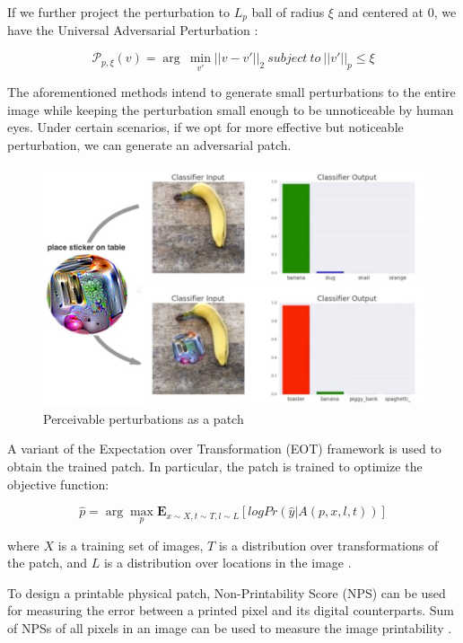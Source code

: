 If we further project the perturbation to $L_p$ ball of radius $\xi$ and centered at 0, we have the Universal Adversarial Perturbation \citep{moosavidezfooli2017universal}:

$$\mathcal{P}_{p, \xi}(v) = \arg\ \underset{v'}{\min}||v-v'||_2\ subject\ to\ ||v'||_p\leq\xi$$


The aforementioned methods intend to generate small perturbations to the entire image while keeping the perturbation small enough to be unnoticeable by human eyes. Under certain scenarios, if we opt for more effective but noticeable perturbation, we can generate an adversarial patch.

\begin{figure}[H]
\centering
\includegraphics[scale=0.5]{figures/chapter_intro/adv_patch.jpg}
\caption{Perceivable perturbations as a patch}
\label{fig.adv_patch}
\end{figure}

A variant of the Expectation over Transformation (EOT) framework \citep{athalye2018synthesizing} is used to obtain the trained patch. In particular, the patch is trained to optimize the objective function:

$$\hat{p} = \arg \underset{p}{\max}\mathbf{E}_{x \sim X, t \sim T,l \sim L}[logPr(\hat{y}|A(p,x,l,t))]$$

where $X$ is a training set of images, $T$ is a distribution over transformations of the patch, and $L$ is a distribution over locations in the image \citep{brown2018adversarial}.

To design a printable physical patch, Non-Printability Score (NPS) can be used for measuring the error between a printed pixel and its digital counterparts. Sum of NPSs of all pixels in an image can be used to measure the image printability \citep{wang2021daedalus}.

